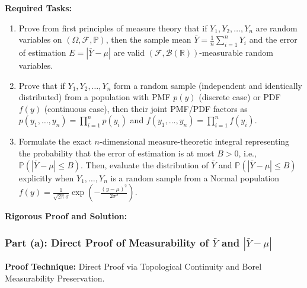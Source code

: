 \documentclass[11pt, letterpaper]{article}
\theoremstyle{definition}
\theoremstyle{remark}
\newcommand{\R}{\mathbb{R}}
\newcommand{\Prob}{\mathbb{P}}
\newcommand{\F}{\mathcal{F}}
\begin{document}
\textbf{Required Tasks:}
\begin{enumerate}[label=(\alph*)]
    \item Prove from first principles of measure theory that if $Y_1, Y_2, \dots, Y_n$ are random variables on $(\Omega, \F, \Prob)$, then the sample mean $\bar{Y} = \frac{1}{n}\sum_{i=1}^n Y_i$ and the error of estimation $E = |\bar{Y} - \mu|$ are valid $(\F, \mathcal{B}(\R))$-measurable random variables.
    \item Prove that if $Y_1, Y_2, \dots, Y_n$ form a random sample (independent and identically distributed) from a population with PMF $p(y)$ (discrete case) or PDF $f(y)$ (continuous case), then their joint PMF/PDF factors as $p(y_1, \dots, y_n) = \prod_{i=1}^n p(y_i)$ and $f(y_1, \dots, y_n) = \prod_{i=1}^n f(y_i)$.
    \item Formulate the exact $n$-dimensional measure-theoretic integral representing the probability that the error of estimation is at most $B > 0$, i.e., $\Prob(|\bar{Y} - \mu| \le B)$. Then, evaluate the distribution of $\bar{Y}$ and $\Prob(|\bar{Y} - \mu| \le B)$ explicitly when $Y_1, \dots, Y_n$ is a random sample from a Normal population $f(y) = \frac{1}{\sqrt{2\pi}\sigma}\exp\left(-\frac{(y-\mu)^2}{2\sigma^2}\right)$.
\end{enumerate}

\hr
\textbf{Rigorous Proof and Solution:}

\subsubsection*{Part (a): Direct Proof of Measurability of $\bar{Y}$ and $|\bar{Y} - \mu|$}
\textbf{Proof Technique:} Direct Proof via Topological Continuity and Borel Measurability Preservation.
\end{document}
